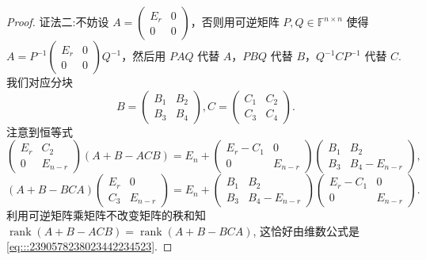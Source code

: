 \documentclass[../../main.tex]{subfiles}
\begin{document}
\begin{proof}
{\color{blue}证法二:}不妨设 $A = \begin{pmatrix} E_r & 0 \\ 0 & 0 \end{pmatrix}$，否则用可逆矩阵 $P, Q \in \mathbb{F}^{n \times n}$ 使得 $A = P^{-1} \begin{pmatrix} E_r & 0 \\ 0 & 0 \end{pmatrix} Q^{-1}$，然后用 $PAQ$ 代替 $A$，$PBQ$ 代替 $B$，$Q^{-1}CP^{-1}$ 代替 $C$. 我们对应分块
\[
B = \begin{pmatrix} B_1 & B_2 \\ B_3 & B_4 \end{pmatrix}, C = \begin{pmatrix} C_1 & C_2 \\ C_3 & C_4 \end{pmatrix}.
\]
注意到恒等式
\[
\begin{pmatrix}
E_r & C_2 \\
0 & E_{n - r}
\end{pmatrix}(A + B - ACB) = E_n + \begin{pmatrix}
E_r - C_1 & 0 \\
0 & E_{n - r}
\end{pmatrix}\begin{pmatrix}
B_1 & B_2 \\
B_3 & B_4 - E_{n - r}
\end{pmatrix},
\]
\[
(A + B - BCA)\begin{pmatrix}
E_r & 0 \\
C_3 & E_{n - r}
\end{pmatrix} = E_n + \begin{pmatrix}
B_1 & B_2 \\
B_3 & B_4 - E_{n - r}
\end{pmatrix}\begin{pmatrix}
E_r - C_1 & 0 \\
0 & E_{n - r}
\end{pmatrix}.
\]
利用可逆矩阵乘矩阵不改变矩阵的秩和知 $\operatorname{rank}(A + B - ACB) = \operatorname{rank}(A + B - BCA)$, 这恰好由维数公式是\eqref{eq:::2390578238023442234523}. 

\end{proof}
\end{document}
